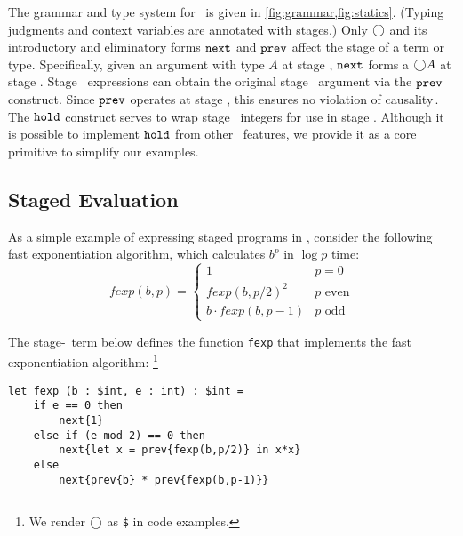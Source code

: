 The grammar and type system for \lang\ is given in
\ref{fig:grammar,fig:statics}. (Typing judgments and context variables are annotated with stages.)
Only $\bigcirc$ and its introductory and eliminatory forms ${\tt next}$ and ${\tt prev}$ affect the stage
of a term or type.
Specifically, given an argument with type $A$ at stage \bbtwo, ${\tt next}$ forms a $\bigcirc A$ at stage \bbone.  
Stage \bbtwo\ expressions can obtain the original stage \bbtwo\ argument via the ${\tt prev}$ construct.  
Since ${\tt prev}$ operates at stage \bbtwo, this ensures no violation of causality\,\cite{cave14}.
The ${\tt hold}$ construct serves to wrap stage \bbone\ integers for use in stage \bbtwo.  
Although it is possible to implement ${\tt hold}$ from other \lang\ features, 
we provide it as a core primitive to simplify our examples. 

\subsection{Staged Evaluation}

As a simple example of expressing staged programs in \lang, consider the following fast exponentiation algorithm, which 
calculates $b^p$ in $\log p$ time:
\[
	\mathit{fexp}(b,p) = \left \{ \begin{array}{ll} 
		1 &  p = 0 \\ 
		\mathit{fexp}(b,p/2)^2 & p \text{ even} \\ 
		b \cdot \mathit{fexp}(b,p-1) & p \text{ odd} \end{array}
	\right .
\]

\noindent
The stage-\bbone\ term below defines the function {\tt fexp} that implements the fast exponentiation algorithm:%
\footnote{We render $\bigcirc$ as {\tt \$} in code examples.}

\begin{lstlisting} 
let fexp (b : $int, e : int) : $int =
	if e == 0 then
		next{1}
	else if (e mod 2) == 0 then
		next{let x = prev{fexp(b,p/2)} in x*x}
	else
		next{prev{b} * prev{fexp(b,p-1)}}		
\end{lstlisting}

